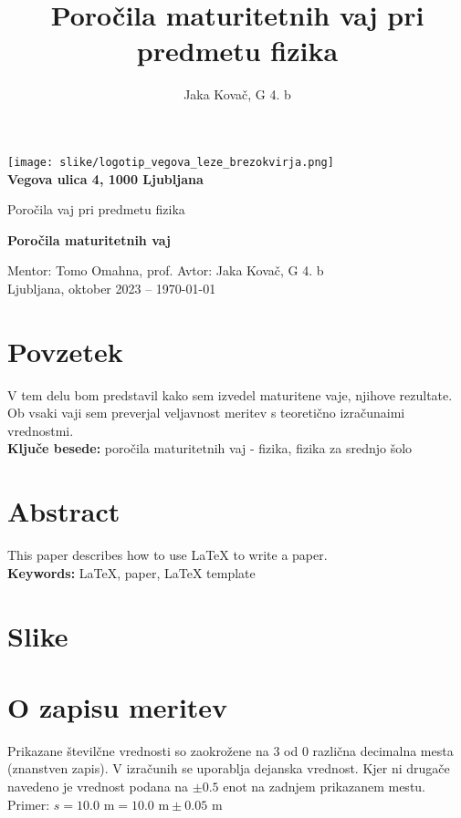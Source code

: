 \documentclass[12pt]{article}
\title{Poročila maturitetnih vaj pri predmetu fizika}
\author{Jaka Kovač, G 4. b}
\begin{document}

\begin{center}
    \thispagestyle{empty}
    \texttt{[image: slike/logotip\_vegova\_leze\_brezokvirja.png]}
    \\
    \textbf{Vegova ulica 4, 1000 Ljubljana}

    \vspace{\fill} 
    Poročila vaj pri predmetu fizika

    \Huge{\textbf{Poročila maturitetnih vaj}}

    \normalsize
    \vspace{\fill}

    Mentor: Tomo Omahna, prof. \hfill Avtor: Jaka Kovač, G 4. b\\
    \null
    Ljubljana, oktober 2023 – \MMYYYYdate\today %
\end{center}
\newpage
\thispagestyle{empty}
\null
\newpage

\section*{Povzetek}
V tem delu bom predstavil kako sem izvedel maturitene vaje, njihove rezultate. Ob vsaki vaji
sem preverjal veljavnost meritev s teoretično izračunaimi vrednostmi.
\\ %
\textbf{Ključe besede:} poročila maturitetnih vaj - fizika, fizika za srednjo šolo

\vfill
\section*{Abstract}
\foreignlanguage{english}{This paper describes how to use \LaTeX{} to write a paper.
\\ %
\textbf{Keywords:} \LaTeX{}, paper, \LaTeX{} template}
\vfill

\newpage
\thispagestyle{empty} %
\tableofcontents %

\begingroup     %
\makeatletter
\section*{Slike}
\let\clearpage\relax
\makeatother
\endgroup


\newpage

\section*{O zapisu meritev}
Prikazane številčne vrednosti so zaokrožene na 3 od 0 različna decimalna mesta (znanstven zapis).
V izračunih se uporablja dejanska vrednost. Kjer ni drugače navedeno je vrednost podana na
$\pm 0.5$ enot na zadnjem prikazanem mestu. Primer: $s = 10.0 \text{ m} = 10.0 \text{ m} \pm 0.05 \text{ m}$
\end{document}
